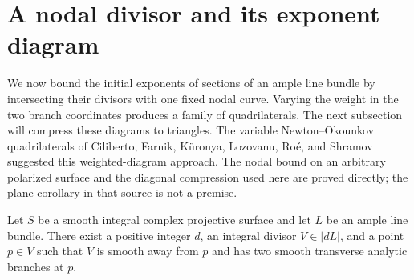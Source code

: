 \section{A nodal divisor and its exponent diagram}
\label{sec:node}

We now bound the initial exponents of sections of an ample line bundle by intersecting their divisors with one fixed nodal curve.  Varying the weight in the two branch coordinates produces a family of quadrilaterals.  The next subsection will compress these diagrams to triangles. The variable Newton--Okounkov quadrilaterals of Ciliberto, Farnik, K{\"u}ronya, Lozovanu, Ro\'e, and Shramov \cite[Section~5.1 and Corollary~5.8]{CFKLRS2016} suggested this weighted-diagram approach.  The nodal bound on an arbitrary polarized surface and the diagonal compression used here are proved directly; the plane corollary in that source is not a premise.

\begin{lemma}
\label{lem:node}
Let $S$ be a smooth integral complex projective surface and let $L$ be an ample line bundle.  There exist a positive integer $d$, an integral divisor $V\in|dL|$, and a point $p\in V$ such that $V$ is smooth away from $p$ and has two smooth transverse analytic branches at $p$.
\end{lemma}

